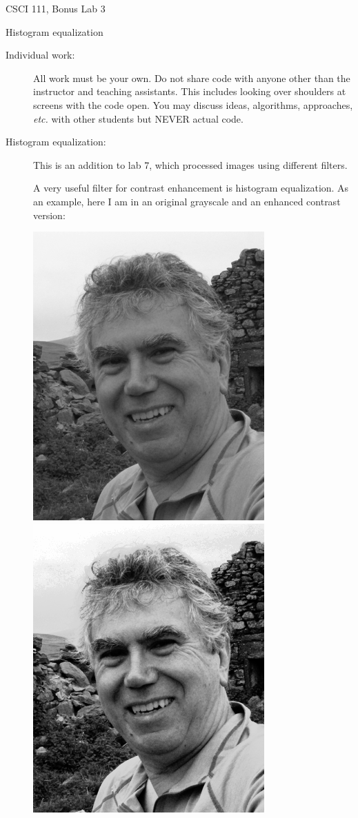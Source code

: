 \documentclass[12pt]{article}
\begin{document}
\sloppy
\centerline{\Large CSCI 111, Bonus Lab 3}
\centerline{\large Histogram equalization}


\begin{description}

\item[Individual work:]  All work must be your own.  Do not share
code with anyone other than the instructor and teaching assistants.
This includes looking over shoulders at screens with the code open.
You may discuss ideas, algorithms, approaches, {\em etc.} with
other students but NEVER actual code.

\item[Histogram equalization:]
This is an addition to lab 7, which processed images
using different filters.

A very useful filter for contrast enhancement is
histogram equalization.  As an example, here I am
in an original grayscale and an enhanced contrast
version:

\includegraphics[scale=0.5]{greyscalegeoff}\hfill
\includegraphics[scale=0.5]{equalizedgeoff}


\end{description}
\end{document}

